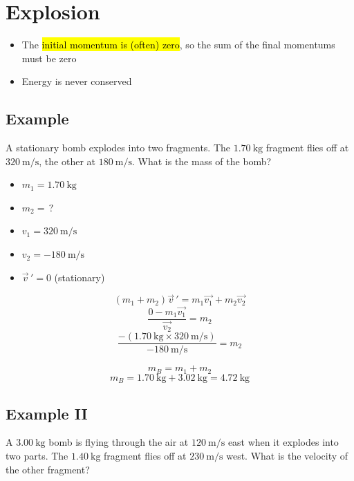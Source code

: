 \documentclass[a4paper,12pt]{article}
\begin{document}
\section{Explosion}
\begin{itemize}
    \item{The \hl{initial momentum is (often) zero}, so the sum of the final momentums must be zero}
    \item{Energy is never conserved}
\end{itemize}

\subsection{Example}
A stationary bomb explodes into two fragments. The $\SI{1.70}{\kg}$ fragment flies off at $\SI{320}{\m\per\s}$, the other at $\SI{180}{\m\per\s}$. What is the mass of the bomb?

\begin{itemize}
    \item{$m_1 = \SI{1.70}{\kg}$}
    \item{$m_2 = \,?$}
    \item{$v_1 = \SI{320}{\m\per\s}$}
    \item{$v_2 = \SI{-180}{\m\per\s}$}
    \item{$\vec{v}\,' = 0$ (stationary)}
\end{itemize}

$$(m_1 + m_2)\vec{v}\,' = m_1\vec{v_1} + m_2\vec{v_2}$$
$$\frac{0 - m_1\vec{v_1}}{\vec{v_2}} = m_2$$
$$\frac{-(\SI{1.70}{\kg} \times \SI{320}{\m\per\s})}{\SI{-180}{\m\per\s}} = m_2$$

$$m_B = m_1 + m_2$$
$$m_B = \SI{1.70}{\kg} + \SI{3.02}{\kg} = \SI{4.72}{\kg}$$

\pagebreak

\subsection{Example II}
A $\SI{3.00}{\kg}$ bomb is flying through the air at $\SI{120}{\m\per\s}$ east when it explodes into two parts. The $\SI{1.40}{\kg}$ fragment flies off at $\SI{230}{\m\per\s}$ west. What is the velocity of the other fragment?
\end{document}

